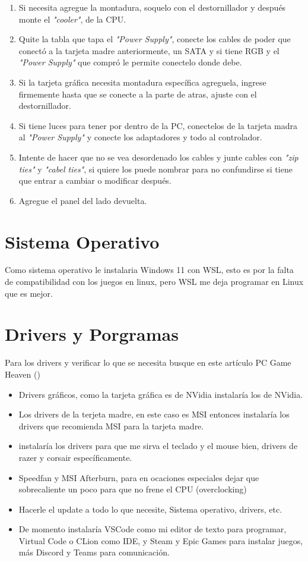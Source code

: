 \documentclass[12pt, a4paper]{article}
\begin{document}
\begin{enumerate}
    \item Si necesita agregue la montadura, soquelo con el destornillador y después monte el \textit{"cooler"}, de la CPU.
    \item Quite la tabla que tapa el \textit{"Power Supply"}, conecte los cables de poder que conectó a la tarjeta madre anteriormente, un SATA y si tiene RGB y el \textit{"Power Supply"} que compró le permite conectelo donde debe.
    \item Si la tarjeta gráfica necesita montadura específica agreguela, ingrese firmemente hasta que se conecte a la parte de atras, ajuste con el destornillador.
    \item Si tiene luces para tener por dentro de la PC, conectelos de la tarjeta madra al \textit{"Power Supply"} y conecte los adaptadores y todo al controlador.
    \item Intente de hacer que no se vea desordenado los cables y junte cables con \textit{"zip ties"} y \textit{"cabel ties"}, si quiere los puede nombrar para no confundirse si tiene que entrar a cambiar o modificar después.
    \item Agregue el panel del lado devuelta.
\end{enumerate}

\section{Sistema Operativo}
Como sistema operativo le instalaria Windows 11 con WSL, esto es por la falta de compatibilidad con los juegos en linux, pero WSL me deja programar en Linux que es mejor.
\section{Drivers y Porgramas}
Para los drivers y verificar lo que se necesita busque en este artículo PC Game Heaven (\cite{NecessaryDrivers})
\begin{itemize}
    \item Drivers gráficos, como la tarjeta gráfica es de NVidia instalaría los de NVidia.
    \item Los drivers de la terjeta madre, en este caso es MSI entonces instalaría los drivers que recomienda MSI para la tarjeta madre.
    \item instalaría los drivers para que me sirva el teclado y el mouse bien, drivers de razer y corsair específicamente.
    \item Speedfan y MSI Afterburn, para en ocaciones especiales dejar que sobrecaliente un poco para que no frene el CPU (overclocking)
    \item Hacerle el update a todo lo que necesite, Sistema operativo, drivers, etc.
    \item De momento instalaría VSCode como mi editor de texto para programar, Virtual Code o CLion como IDE, y Steam y Epic Games para instalar juegos, más Discord y Teams para comunicación.
\end{itemize}

\newpage
\printbibliography
\end{document}
